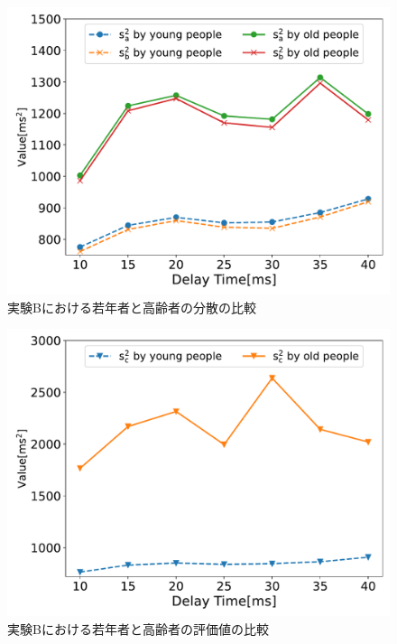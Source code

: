 \begin{figure}[tbp]
  \centering
  \includegraphics[scale=0.5]{figures/Honbann/Comparison_young_old/40_var_SaSb.pdf}
  \caption{実験Bにおける若年者と高齢者の分散の比較}
  \label{fig:Var_40ms_Sa_Sb}
\end{figure}

\begin{figure}[tbp]
  \centering
  \includegraphics[scale=0.5]{figures/Honbann/Comparison_young_old/40_var_Sc.pdf}
  \caption{実験Bにおける若年者と高齢者の評価値の比較}
  \label{fig:Var_40ms_Sc}
\end{figure}

